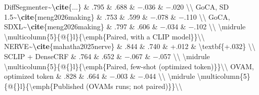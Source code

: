 \documentclass[
  10pt,
]{article}
\newenvironment{Shaded}{}{}
\newcommand{\CharTok}[1]{\textcolor[rgb]{0.25,0.44,0.63}{#1}}
\newcommand{\ExtensionTok}[1]{#1}
\newcommand{\FunctionTok}[1]{\textcolor[rgb]{0.02,0.16,0.49}{#1}}
\newcommand{\KeywordTok}[1]{\textcolor[rgb]{0.00,0.44,0.13}{\textbf{#1}}}
\newcommand{\NormalTok}[1]{#1}
\newcommand{\OperatorTok}[1]{\textcolor[rgb]{0.40,0.40,0.40}{#1}}
\newcommand{\SpecialStringTok}[1]{\textcolor[rgb]{0.73,0.40,0.53}{#1}}
\begin{document}
\begin{Shaded}
\begin{Highlighting}[]
\NormalTok{DiffSegmenter\textasciitilde{}}\KeywordTok{\textbackslash{}cite}\NormalTok{\{}\ExtensionTok{...}\NormalTok{\} }\OperatorTok{\&}\NormalTok{ .795 }\OperatorTok{\&}\NormalTok{ .688 }\OperatorTok{\&} \SpecialStringTok{${-}$}\NormalTok{.036 }\OperatorTok{\&} \SpecialStringTok{${-}$}\NormalTok{.020 }\FunctionTok{\textbackslash{}\textbackslash{}}
\NormalTok{GoCA, SD 1.5\textasciitilde{}}\KeywordTok{\textbackslash{}cite}\NormalTok{\{}\ExtensionTok{meng2026making}\NormalTok{\} }\OperatorTok{\&}\NormalTok{ .753 }\OperatorTok{\&}\NormalTok{ .599 }\OperatorTok{\&} \SpecialStringTok{${-}$}\NormalTok{.078 }\OperatorTok{\&} \SpecialStringTok{${-}$}\NormalTok{.110 }\FunctionTok{\textbackslash{}\textbackslash{}}
\NormalTok{GoCA, SDXL\textasciitilde{}}\KeywordTok{\textbackslash{}cite}\NormalTok{\{}\ExtensionTok{meng2026making}\NormalTok{\} }\OperatorTok{\&}\NormalTok{ .797 }\OperatorTok{\&}\NormalTok{ .606 }\OperatorTok{\&} \SpecialStringTok{${-}$}\NormalTok{.034 }\OperatorTok{\&} \SpecialStringTok{${-}$}\NormalTok{.102 }\FunctionTok{\textbackslash{}\textbackslash{}}
\FunctionTok{\textbackslash{}midrule}
\FunctionTok{\textbackslash{}multicolumn}\NormalTok{\{5\}\{}\CharTok{@\{\}}\NormalTok{l\}\{}\FunctionTok{\textbackslash{}emph}\NormalTok{\{Paired, with a CLIP model\}\}}\FunctionTok{\textbackslash{}\textbackslash{}}
\NormalTok{NERVE\textasciitilde{}}\KeywordTok{\textbackslash{}cite}\NormalTok{\{}\ExtensionTok{mahatha2025nerve}\NormalTok{\} }\OperatorTok{\&}\NormalTok{ .844 }\OperatorTok{\&}\NormalTok{ .740 }\OperatorTok{\&}\NormalTok{ +.012 }\OperatorTok{\&} \FunctionTok{\textbackslash{}textbf}\NormalTok{\{+.032\} }\FunctionTok{\textbackslash{}\textbackslash{}}
\NormalTok{SCLIP + DenseCRF }\OperatorTok{\&}\NormalTok{ .764 }\OperatorTok{\&}\NormalTok{ .652 }\OperatorTok{\&} \SpecialStringTok{${-}$}\NormalTok{.067 }\OperatorTok{\&} \SpecialStringTok{${-}$}\NormalTok{.057 }\FunctionTok{\textbackslash{}\textbackslash{}}
\FunctionTok{\textbackslash{}midrule}
\FunctionTok{\textbackslash{}multicolumn}\NormalTok{\{5\}\{}\CharTok{@\{\}}\NormalTok{l\}\{}\FunctionTok{\textbackslash{}emph}\NormalTok{\{Paired, few{-}shot (optimized token)\}\}}\FunctionTok{\textbackslash{}\textbackslash{}}
\NormalTok{OVAM, optimized token }\OperatorTok{\&}\NormalTok{ .828 }\OperatorTok{\&}\NormalTok{ .664 }\OperatorTok{\&} \SpecialStringTok{${-}$}\NormalTok{.003 }\OperatorTok{\&} \SpecialStringTok{${-}$}\NormalTok{.044 }\FunctionTok{\textbackslash{}\textbackslash{}}
\FunctionTok{\textbackslash{}midrule}
\FunctionTok{\textbackslash{}multicolumn}\NormalTok{\{5\}\{}\CharTok{@\{\}}\NormalTok{l\}\{}\FunctionTok{\textbackslash{}emph}\NormalTok{\{Published (OVAM\textquotesingle{}s runs; not paired)\}\}}\FunctionTok{\textbackslash{}\textbackslash{}}

\end{Highlighting}
\end{Shaded}
\end{document}
